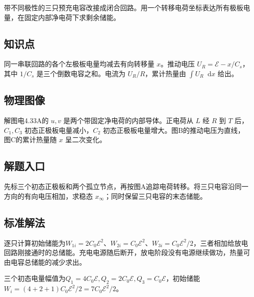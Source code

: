 \documentclass[UTF8,fontset=fandol,a4paper,11pt]{ctexart}
\newcommand{\dd}{\mathop{}\!\mathrm{d}}
\begin{document}
带不同极性的三只预充电容改接成闭合回路。用一个转移电荷坐标表达所有极板电量，在固定内部净电荷下求剩余储能。



\subsection*{知识点}

同一串联回路的各个左极板电量均减去有向转移量 $x$。推动电压 $U_R=\mathcal E-x/C_s$，其中 $1/C_s$ 是三个倒数电容之和。电流为 $U_R/R$，累计热量由 $\int U_R\dd x$ 给出。



\subsection*{物理图像}

解图电4.33A的 $u,v$ 是两个带固定净电荷的内部导体。正电荷从 $L$ 经 $R$ 到 $T$ 后，$C_1,C_3$ 初态正极板电量减小，$C_2$ 初态正极板电量增大。图B的推动电压为直线，图C的累计热量随 $x$ 呈二次变化。



\subsection*{解题入口}

先标三个初态正极板和两个孤立节点，再按图A追踪电荷转移。将三只电容沿同一方向的有向电压相加，求稳态 $x_\infty$；同时保留三只电容的末态储能。


\subsection*{标准解法}

逐只计算初始储能为$W_{1i}=2C_0\mathcal E^2$、$W_{2i}=C_0\mathcal E^2$、$W_{3i}=C_0\mathcal E^2/2$，三者相加给放电回路刚接通时的总储能。充电电源随后断开，放电阶段没有电源继续做功，热量可由电容总储能的减少求出。

三个初态电量幅值为$Q_1=4C_0\mathcal E,Q_2=2C_0\mathcal E,Q_3=C_0\mathcal E$，初始储能
$W_i=(4+2+1)C_0\mathcal E^2/2=7C_0\mathcal E^2/2$。
\end{document}
